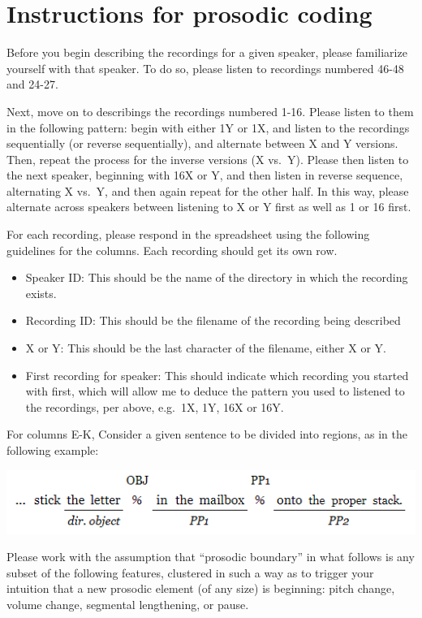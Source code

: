 \documentclass[12pt,oneside]{book}
\providecommand{\tightlist}{%
  \setlength{\itemsep}{0pt}\setlength{\parskip}{0pt}}
\begin{document}
\hypertarget{RA}{%
\chapter{Instructions for prosodic coding}\label{RA}}

Before you begin describing the recordings for a given speaker, please familiarize yourself with that speaker. To do so, please listen to recordings numbered 46-48 and 24-27.

Next, move on to describings the recordings numbered 1-16. Please listen to them in the following pattern: begin with either 1Y or 1X, and listen to the recordings sequentially (or reverse sequentially), and alternate between X and Y versions. Then, repeat the process for the inverse versions (X vs.~Y). Please then listen to the next speaker, beginning with 16X or Y, and then listen in reverse sequence, alternating X vs.~Y, and then again repeat for the other half. In this way, please alternate across speakers between listening to X or Y first as well as 1 or 16 first.

For each recording, please respond in the spreadsheet using the following guidelines for the columns. Each recording should get its own row.

\begin{itemize}
\tightlist
\item
  Speaker ID: This should be the name of the directory in which the recording exists.
\item
  Recording ID: This should be the filename of the recording being described
\item
  X or Y: This should be the last character of the filename, either X or Y.
\item
  First recording for speaker: This should indicate which recording you started with first, which will allow me to deduce the pattern you used to listened to the recordings, per above, e.g.~1X, 1Y, 16X or 16Y.
\end{itemize}

For columns E-K, Consider a given sentence to be divided into regions, as in the following example:

\includegraphics{breakpos.png}

Please work with the assumption that ``prosodic boundary'' in what follows is any subset of the following features, clustered in such a way as to trigger your intuition that a new prosodic element (of any size) is beginning: pitch change, volume change, segmental lengthening, or pause.
\end{document}
